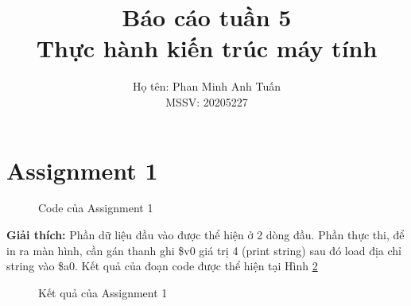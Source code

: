 \documentclass[a4paper,12pt]{article}
\title{\textbf{Báo cáo tuần 5 \\ Thực hành kiến trúc máy tính}}
\author{Họ tên: Phan Minh Anh Tuấn \\ MSSV: 20205227}
\date{}
\begin{document}
	\maketitle
	\tableofcontents
	\newpage
\section{Assignment 1}
\begin{figure}[!h]
	\centerline{}
	\caption{Code của Assignment 1}
	\label{fig:ass1}
\end{figure}
\noindent
\textbf{Giải thích: }Phần dữ liệu đầu vào được thể hiện ở 2 dòng đầu. Phần thực thi, để in ra màn hình, cần gán thanh ghi \$v0 giá trị 4 (print string) sau đó load địa chỉ string vào \$a0. Kết quả của đoạn code được thể hiện tại Hình \ref{fig:ass1_result}
\begin{figure}[!h]
	\centerline{}
	\caption{Kết quả của Assignment 1}
	\label{fig:ass1_result}
\end{figure}	
\clearpage
\end{document}
